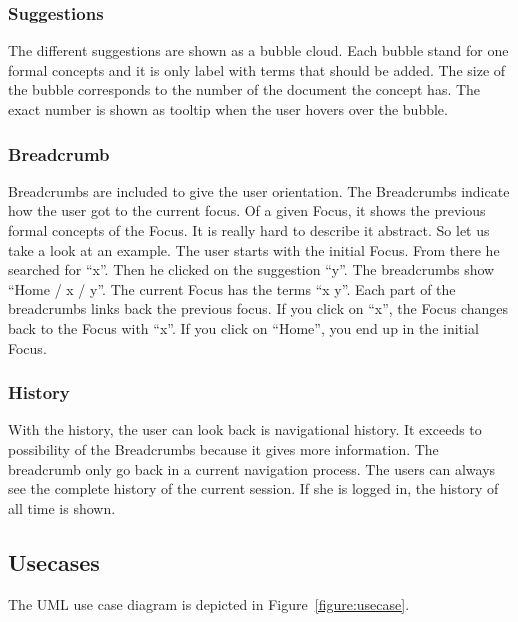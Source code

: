 \documentclass[11pt]{report}
\begin{document}
\subsubsection{Suggestions}

The different suggestions are shown as a bubble cloud. Each bubble stand for one formal concepts and it is only label with terms that should be added. The size of the bubble corresponds to the number of the document the concept has. The exact number is shown as tooltip when the user hovers over the bubble.

\subsubsection{Breadcrumb}

Breadcrumbs are included to give the user orientation. The Breadcrumbs indicate how the user got to the current focus. Of a given Focus, it shows the previous formal concepts of the Focus. It is really hard to describe it abstract. So let us take a look at an example. The user starts with the initial Focus. From there he searched for ``x''. Then he clicked on the suggestion ``y''. The breadcrumbs show ``Home / x / y''. The current Focus has the terms ``x y''. Each part of the breadcrumbs links back the previous focus. If you click on ``x'', the Focus changes back to the Focus with ``x''. If you click on ``Home'', you end up in the initial Focus. 

\subsubsection{History}

With the history, the user can look back is navigational history. It exceeds to possibility of the Breadcrumbs because it gives more information. The breadcrumb only go back in a current navigation process. The users can always see the complete history of the current session. If she is logged in, the history of all time is shown.

\subsection{Usecases}
The UML use case diagram is depicted in Figure~\ref{figure:usecase}.
\end{document}

